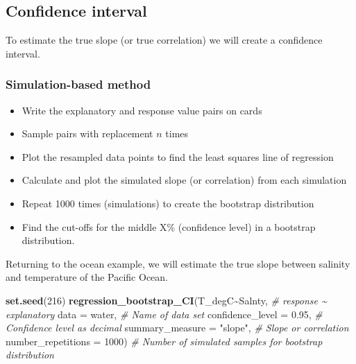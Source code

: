\documentclass[
]{report}
\newenvironment{Shaded}{\begin{snugshade}}{\end{snugshade}}
\newcommand{\AttributeTok}[1]{\textcolor[rgb]{0.13,0.29,0.53}{#1}}
\newcommand{\CommentTok}[1]{\textcolor[rgb]{0.56,0.35,0.01}{\textit{#1}}}
\newcommand{\DecValTok}[1]{\textcolor[rgb]{0.00,0.00,0.81}{#1}}
\newcommand{\FloatTok}[1]{\textcolor[rgb]{0.00,0.00,0.81}{#1}}
\newcommand{\FunctionTok}[1]{\textcolor[rgb]{0.13,0.29,0.53}{\textbf{#1}}}
\newcommand{\NormalTok}[1]{#1}
\newcommand{\SpecialCharTok}[1]{\textcolor[rgb]{0.81,0.36,0.00}{\textbf{#1}}}
\newcommand{\StringTok}[1]{\textcolor[rgb]{0.31,0.60,0.02}{#1}}
\begin{document}
\hypertarget{confidence-interval-10}{%
\subsection*{Confidence interval}\label{confidence-interval-10}}

To estimate the true slope (or true correlation) we will create a confidence interval.

\hypertarget{simulation-based-method-9}{%
\subsubsection*{Simulation-based method}\label{simulation-based-method-9}}

\begin{itemize}
\item
  Write the explanatory and response value pairs on cards
\item
  Sample pairs with replacement \(n\) times
\item
  Plot the resampled data points to find the least squares line of regression
\item
  Calculate and plot the simulated slope (or correlation) from each simulation
\item
  Repeat 1000 times (simulations) to create the bootstrap distribution
\item
  Find the cut-offs for the middle X\% (confidence level) in a bootstrap distribution.
\end{itemize}

Returning to the ocean example, we will estimate the true slope between salinity and temperature of the Pacific Ocean.

\begin{Shaded}
\begin{Highlighting}[]
\FunctionTok{set.seed}\NormalTok{(}\DecValTok{216}\NormalTok{)}
\FunctionTok{regression\_bootstrap\_CI}\NormalTok{(T\_degC}\SpecialCharTok{\textasciitilde{}}\NormalTok{Salnty, }\CommentTok{\# response \textasciitilde{} explanatory}
   \AttributeTok{data =}\NormalTok{ water, }\CommentTok{\# Name of data set}
   \AttributeTok{confidence\_level =} \FloatTok{0.95}\NormalTok{, }\CommentTok{\# Confidence level as decimal}
   \AttributeTok{summary\_measure =} \StringTok{"slope"}\NormalTok{, }\CommentTok{\# Slope or correlation}
   \AttributeTok{number\_repetitions =} \DecValTok{1000}\NormalTok{) }\CommentTok{\# Number of simulated samples for bootstrap distribution}
\end{Highlighting}
\end{Shaded}
\end{document}
